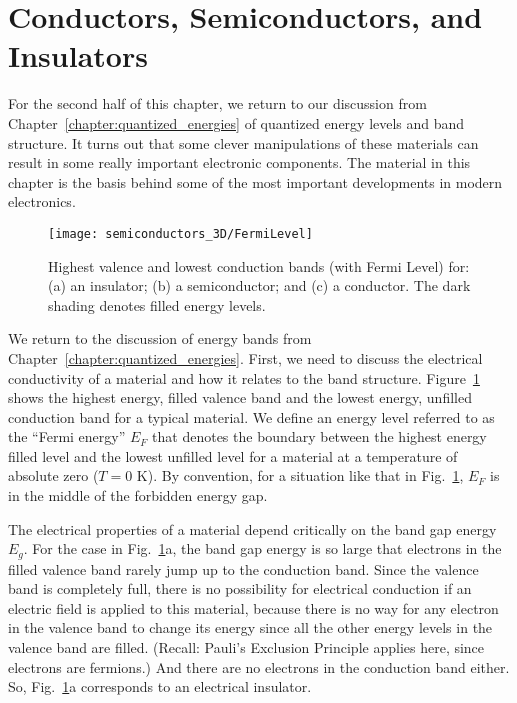 \section{Conductors, Semiconductors, and Insulators}
\label{sec:conductors_semiconsuctors_insulators}

For the second half of this chapter, we return to our discussion from
Chapter~\ref{chapter:quantized_energies} of quantized energy levels
and band structure. It turns out that some clever manipulations of
these materials can result in some really important electronic
components. The material in this chapter is the basis behind some of
the most important developments in modern electronics.

\begin{figure}
\begin{center}
\texttt{[image: semiconductors\_3D/FermiLevel]}
\end{center}
\caption{Highest valence and lowest conduction bands (with Fermi Level) for:
(a) an insulator; (b) a semiconductor; and (c) a conductor. The dark shading
denotes filled energy levels.}
\label{fig:FermiLevel}
\end{figure}

We return to the discussion of energy bands from 
Chapter~\ref{chapter:quantized_energies}.
First, we need to discuss the electrical conductivity of a material
and how it relates to the band structure. Figure~\ref{fig:FermiLevel}
shows the highest energy, filled valence band and the lowest energy,
unfilled conduction band for a typical material. We define an energy 
level referred to as
the ``Fermi energy'' $E_F$ that denotes the boundary between the
highest energy filled level and the lowest unfilled level for a
material at a temperature of absolute zero ($T = 0$ K). By convention,
for a situation like that in Fig.~\ref{fig:FermiLevel}, $E_F$ is in
the middle of the forbidden energy gap.

The electrical properties of a material depend critically on the band gap
energy $E_g$. For the case in Fig.~\ref{fig:FermiLevel}a, the band gap
energy is so large that electrons in the filled valence band rarely jump
up to the conduction band. Since the valence band is completely full,
there is no possibility for electrical conduction if an electric field
is applied to this material, because there is no way for any electron in
the valence band to change its energy since all the other energy levels
in the valence band are filled. (Recall: Pauli's Exclusion Principle
applies here, since electrons are fermions.) And there are no electrons
in the conduction band either. So, Fig.~\ref{fig:FermiLevel}a corresponds
to an electrical insulator.

